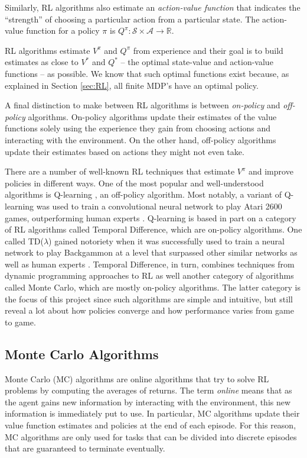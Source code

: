 \documentclass[11pt,a4paper]{report}
\begin{document}
Similarly, RL algorithms also estimate an \emph{action-value function} that indicates the ``strength'' of choosing a particular action from a particular state. The action-value function for a policy $\pi$ is $Q^{\pi} : \mathcal{S} \times \mathcal{A} \rightarrow \mathbb{R}$.

RL algorithms estimate $V^{\pi}$ and $Q^{\pi}$ from experience and their goal is to build estimates as close to $V^{\ast}$ and $Q^{\ast}$ -- the optimal state-value and action-value functions -- as possible. We know that such optimal functions exist because, as explained in Section \ref{sec:RL}, all finite MDP's have an optimal policy.

A final distinction to make between RL algorithms is between \emph{on-policy} and \emph{off-policy} algorithms. On-policy algorithms update their estimates of the value functions solely using the experience they gain from choosing actions and interacting with the environment. On the other hand, off-policy algorithms update their estimates based on actions they might not even take.

There are a number of well-known RL techniques that estimate $V^{\pi}$ and improve policies in different ways. One of the most popular and well-understood \cite{challenges-of-rl} algorithms is Q-learning \cite{q-learning}, an off-policy algorithm. Most notably, a variant of Q-learning was used to train a convolutional neural network to play Atari 2600 games, outperforming human experts \cite{atari}. Q-learning is based in part on a category of RL algorithms called Temporal Difference, which are on-policy algorithms. One called TD($\lambda$) gained notoriety when it was successfully used to train a neural network to play Backgammon at a level that surpassed other similar networks as well as human experts \cite{backgammon}. Temporal Difference, in turn, combines techniques from dynamic programming approaches to RL as well another category of algorithms called Monte Carlo, which are mostly on-policy algorithms. The latter category is the focus of this project since such algorithms are simple and intuitive, but still reveal a lot about how policies converge and how performance varies from game to game.


\subsection{Monte Carlo Algorithms}
\label{sec:MonteCarloAlgorithms}

Monte Carlo (MC) algorithms are online algorithms that try to solve RL problems by computing the averages of returns. The term \emph{online} means that as the agent gains new information by interacting with the environment, this new information is immediately put to use. In particular, MC algorithms update their value function estimates and policies at the end of each episode. For this reason, MC algorithms are only used for tasks that can be divided into discrete episodes that are guaranteed to terminate eventually.
\end{document}

